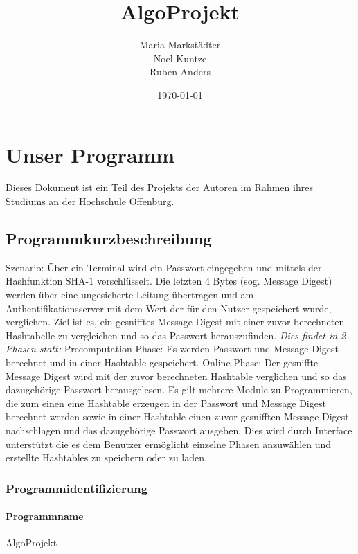 \documentclass[11pt]{article}
\title{\textbf{AlgoProjekt}}
\author{Maria Markstädter\\
                Noel Kuntze\\
                Ruben Anders\\}
\date{\today}
\begin{document}
 

\maketitle

\newpage
\tableofcontents
\newpage
  \section{Unser Programm}
Dieses Dokument ist ein Teil des Projekts der Autoren im Rahmen ihres Studiums an der Hochschule Offenburg.
  \subsection{Programmkurzbeschreibung}
  Szenario:
Über ein Terminal wird ein Passwort eingegeben und  mittels der Hashfunktion SHA-1 verschlüsselt. Die letzten 4 Bytes (sog. Message Digest) werden über eine ungesicherte Leitung übertragen und am Authentifikationsserver mit dem Wert der für den Nutzer gespeichert wurde, verglichen. \newline 
Ziel ist es, ein gesnifftes Message Digest mit einer zuvor berechneten Hashtabelle zu vergleichen und so das Passwort herauszufinden.\vspace{2px}   \newline 
{\itshape{Dies findet in 2 Phasen statt:}} \vspace{2px}   \newline
Precomputation-Phase: Es werden Passwort und Message Digest berechnet und in einer Hashtable gespeichert.\vspace{2px} \newline 
Online-Phase: Der gesniffte Message Digest wird mit der zuvor berechneten Hashtable verglichen und so das dazugehörige Passwort herausgelesen. 
Es gilt mehrere Module zu Programmieren, die zum einen eine Hashtable erzeugen in der Passwort und Message Digest berechnet werden sowie in einer Hashtable einen zuvor gesnifften Message Digest nachschlagen und das dazugehörige Passwort ausgeben. Dies wird durch Interface unterstützt die es dem Benutzer ermöglicht einzelne Phasen anzuwählen und erstellte Hashtables zu speichern oder zu laden.

   
  \subsubsection{Programmidentifizierung}
  \paragraph{Programmname}
  AlgoProjekt
\end{document}
